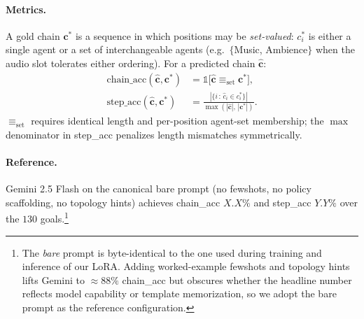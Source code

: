 \paragraph{Metrics.}
A gold chain $\mathbf{c}^*$ is a sequence in which positions may be
\emph{set-valued}: $c^*_i$ is either a single agent or a set of
interchangeable agents (e.g.\ $\{$Music, Ambience$\}$ when the audio
slot tolerates either ordering). For a predicted chain $\hat{\mathbf{c}}$:
\begin{align}
\text{chain\_acc}(\hat{\mathbf{c}},\mathbf{c}^*) &= \mathbb{1}\!\big[\hat{\mathbf{c}}\!\equiv_\text{set}\!\mathbf{c}^*\big], \\
\text{step\_acc}(\hat{\mathbf{c}},\mathbf{c}^*) &= \frac{|\{i\,:\,\hat{c}_i\in c^*_i\}|}{\max(|\hat{\mathbf{c}}|,\,|\mathbf{c}^*|)}.
\end{align}
$\equiv_\text{set}$ requires identical length and per-position
agent-set membership; the $\max$ denominator in step\_acc penalizes
length mismatches symmetrically.

\paragraph{Reference.}
Gemini 2.5 Flash on the canonical bare prompt (no fewshots, no policy
scaffolding, no topology hints) achieves chain\_acc $X.X\%$ and
step\_acc $Y.Y\%$ over the $130$ goals.\footnote{The \emph{bare} prompt
is byte-identical to the one used during training and inference of our
LoRA. Adding worked-example fewshots and topology hints lifts Gemini
to $\approx\!88\%$ chain\_acc but obscures whether the headline number
reflects model capability or template memorization, so we adopt the
bare prompt as the reference configuration.}
